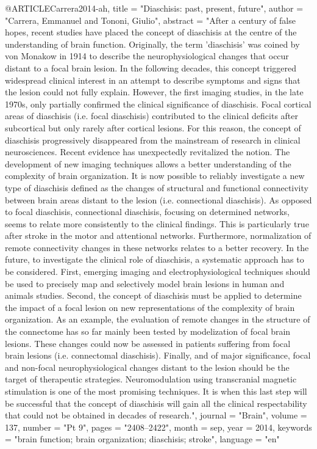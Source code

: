 @ARTICLE{Carrera2014-ah,
	title    = "Diaschisis: past, present, future",
	author   = "Carrera, Emmanuel and Tononi, Giulio",
	abstract = "After a century of false hopes, recent studies have placed the
	concept of diaschisis at the centre of the understanding of brain
	function. Originally, the term 'diaschisis' was coined by von
	Monakow in 1914 to describe the neurophysiological changes that
	occur distant to a focal brain lesion. In the following decades,
	this concept triggered widespread clinical interest in an attempt
	to describe symptoms and signs that the lesion could not fully
	explain. However, the first imaging studies, in the late 1970s,
	only partially confirmed the clinical significance of diaschisis.
	Focal cortical areas of diaschisis (i.e. focal diaschisis)
	contributed to the clinical deficits after subcortical but only
	rarely after cortical lesions. For this reason, the concept of
	diaschisis progressively disappeared from the mainstream of
	research in clinical neurosciences. Recent evidence has
	unexpectedly revitalized the notion. The development of new
	imaging techniques allows a better understanding of the
	complexity of brain organization. It is now possible to reliably
	investigate a new type of diaschisis defined as the changes of
	structural and functional connectivity between brain areas
	distant to the lesion (i.e. connectional diaschisis). As opposed
	to focal diaschisis, connectional diaschisis, focusing on
	determined networks, seems to relate more consistently to the
	clinical findings. This is particularly true after stroke in the
	motor and attentional networks. Furthermore, normalization of
	remote connectivity changes in these networks relates to a better
	recovery. In the future, to investigate the clinical role of
	diaschisis, a systematic approach has to be considered. First,
	emerging imaging and electrophysiological techniques should be
	used to precisely map and selectively model brain lesions in
	human and animals studies. Second, the concept of diaschisis must
	be applied to determine the impact of a focal lesion on new
	representations of the complexity of brain organization. As an
	example, the evaluation of remote changes in the structure of the
	connectome has so far mainly been tested by modelization of focal
	brain lesions. These changes could now be assessed in patients
	suffering from focal brain lesions (i.e. connectomal diaschisis).
	Finally, and of major significance, focal and non-focal
	neurophysiological changes distant to the lesion should be the
	target of therapeutic strategies. Neuromodulation using
	transcranial magnetic stimulation is one of the most promising
	techniques. It is when this last step will be successful that the
	concept of diaschisis will gain all the clinical respectability
	that could not be obtained in decades of research.",
	journal  = "Brain",
	volume   =  137,
	number   = "Pt 9",
	pages    = "2408--2422",
	month    =  sep,
	year     =  2014,
	keywords = "brain function; brain organization; diaschisis; stroke",
	language = "en"
}

